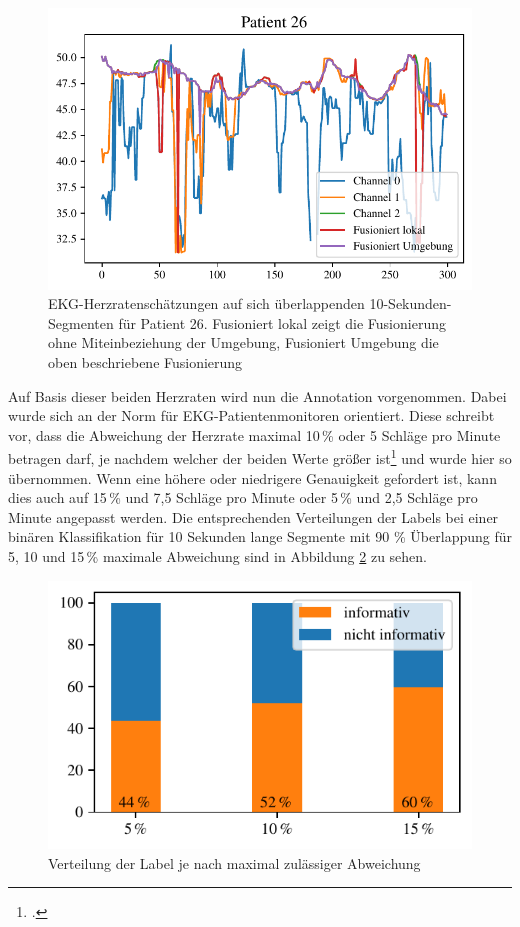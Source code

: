 	\begin{figure}[H]
		\centering
		\includegraphics{pic/ecg-patient-26.pdf}
		\caption[\ac{EKG}-Herzratenschätzungen auf sich überlappenden 10-Sekunden-Segmenten für Patient 26]{\ac{EKG}-Herzratenschätzungen auf sich überlappenden 10-Sekunden-Segmenten für Patient 26. Fusioniert lokal zeigt die Fusionierung ohne Miteinbeziehung der Umgebung, Fusioniert Umgebung die oben beschriebene Fusionierung}
		\label{fig:ecg-patient-26}
	\end{figure}


	Auf Basis dieser beiden Herzraten wird nun die Annotation vorgenommen. Dabei wurde sich an der Norm für \ac{EKG}-Patientenmonitoren orientiert. Diese schreibt vor, dass die Abweichung der Herzrate maximal 10\,\% oder 5 Schläge pro Minute betragen darf, je nachdem welcher der beiden Werte größer ist\footcite[]{DIN} und wurde hier so übernommen. Wenn eine höhere oder niedrigere Genauigkeit gefordert ist, kann dies auch auf 15\,\% und 7{,}5 Schläge pro Minute oder 5\,\% und 2{,}5 Schläge pro Minute angepasst werden. Die entsprechenden Verteilungen der Labels bei einer binären Klassifikation für 10 Sekunden lange Segmente mit 90 \% Überlappung für 5, 10 und 15\,\% maximale Abweichung sind in Abbildung \ref{fig:label-distribution} zu sehen.
	
	\begin{figure}[H]
		\centering
		\includegraphics{pic/label-distribution.pdf}
		\caption[Verteilung der Label je nach maximal zulässiger Abweichung]{Verteilung der Label je nach maximal zulässiger Abweichung}
		\label{fig:label-distribution}
	\end{figure}
	
